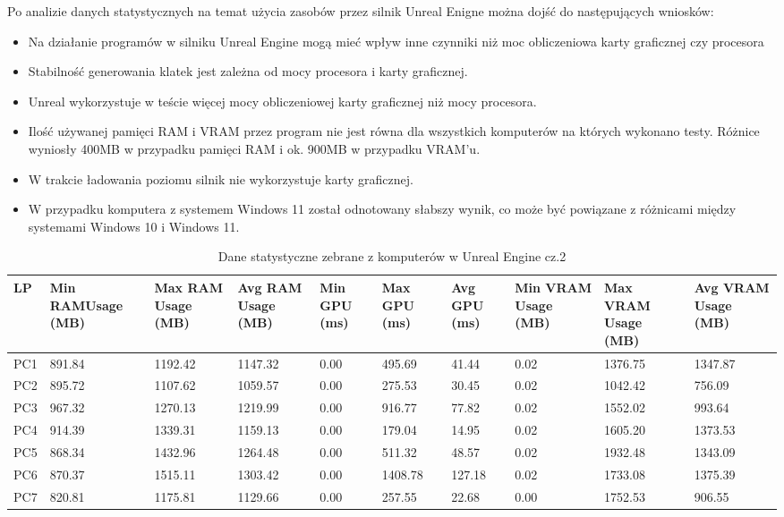 \documentclass[12pt,twoside]{article}
\begin{document}
Po analizie danych statystycznych na temat użycia zasobów przez silnik Unreal
Enigne można dojść do następujących wniosków:
\begin{itemize}
\item Na działanie programów w silniku Unreal Engine mogą mieć wpływ inne
czynniki niż moc obliczeniowa karty graficznej czy procesora
\item Stabilność generowania klatek jest zależna od mocy procesora i karty
graficznej.
\item Unreal wykorzystuje w teście więcej mocy obliczeniowej karty graficznej
niż mocy procesora. 
\item Ilość używanej pamięci RAM i VRAM przez program nie jest równa dla
wszystkich komputerów na których wykonano testy. Różnice wyniosły 400MB w
przypadku pamięci RAM i ok. 900MB w przypadku VRAM’u.
\item W trakcie ładowania poziomu silnik nie wykorzystuje karty graficznej. 
\item W przypadku komputera z systemem Windows 11 został odnotowany słabszy
wynik, co może być powiązane z różnicami między systemami Windows 10 i Windows
11. 

\end{itemize}
\begin{table}[H]
    \caption{Dane statystyczne zebrane z komputerów w Unreal Engine cz.2}
    \centering		
        \begin{tabular}{|p{1cm}|p{}|p{}|p{}|p{1cm}|p{}|p{1cm}|p{1cm}|p{}|p{}|}	
            \hline
            LP & Min RAMUsage (MB) & Max RAM Usage (MB) & Avg RAM Usage (MB) & Min GPU (ms) & Max GPU (ms)  & Avg GPU (ms) & Min VRAM Usage (MB) & Max VRAM Usage (MB) & Avg VRAM Usage (MB) \\
            \hline
            PC1 & 891.84 & 1192.42 & 1147.32 & 0.00 & 495.69 & 41.44 & 0.02 & 1376.75 & 1347.87 \\
            \hline
            PC2 & 895.72 & 1107.62 & 1059.57 & 0.00 & 275.53 & 30.45 & 0.02 & 1042.42 & 756.09 \\
            \hline
            PC3 & 967.32 & 1270.13 & 1219.99 & 0.00 & 916.77 & 77.82 & 0.02 & 1552.02 & 993.64 \\
            \hline
            PC4 & 914.39 & 1339.31 & 1159.13 & 0.00 & 179.04 & 14.95 & 0.02 & 1605.20 & 1373.53 \\
            \hline
            PC5 & 868.34 & 1432.96 & 1264.48 & 0.00 & 511.32 & 48.57 & 0.02 & 1932.48 & 1343.09 \\
            \hline
            PC6 & 870.37 & 1515.11 & 1303.42 & 0.00 & 1408.78 & 127.18 & 0.02 & 1733.08 & 1375.39 \\
            \hline
            PC7 & 820.81 & 1175.81 & 1129.66 & 0.00 & 257.55 & 22.68 & 0.00 & 1752.53 & 906.55 \\
            \hline
            \hline

        \end{tabular}	
\label{Tabela:StatystykiUnreal2}
\end{table}	
\end{document}
